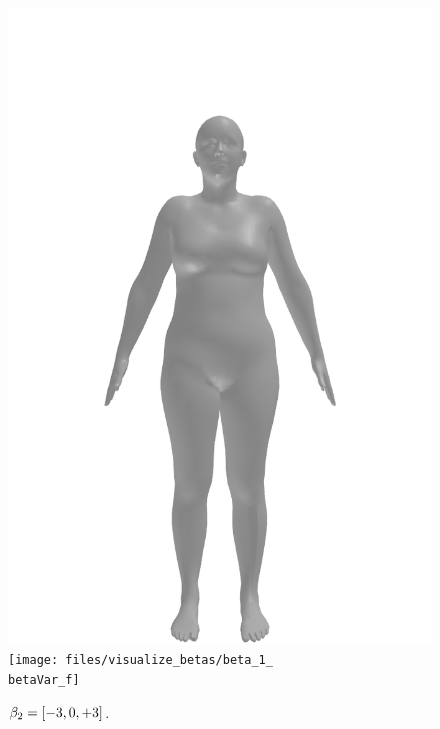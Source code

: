 \begin{figure}[ht!]
\begin{minipage}[b]{\textwidth}
        \includegraphics[width=\imgWidth]{files/visualize_betas/baseline_f}
        \texttt{[image: files/visualize\_betas/beta\_1\_\\betaVar\_f]}
        \caption[Effect of varying $\beta_2$ in SMPL.]{$\beta_2 = [-3, 0, +3]$.}
    \end{minipage}
\end{figure}

